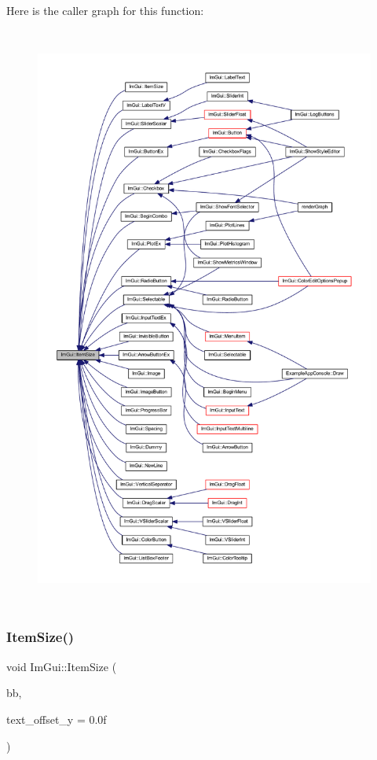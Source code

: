 Here is the caller graph for this function\+:
\nopagebreak
\begin{figure}[H]
\begin{center}
\leavevmode
\includegraphics[height=550pt]{namespace_im_gui_ac7b9a7399d9606b25278002303f545b6_icgraph}
\end{center}
\end{figure}
\mbox{\label{namespace_im_gui_a97b821f022e36964b40973fe1ff4367b}} 
\subsubsection{\texorpdfstring{Item\+Size()}{ItemSize()}\hspace{0.1cm}{\footnotesize\ttfamily [2/2]}}
{\footnotesize\ttfamily void Im\+Gui\+::\+Item\+Size (\begin{DoxyParamCaption}\item[{const \mbox{\hyperlink{struct_im_rect}{Im\+Rect}} \&}]{bb,  }\item[{float}]{text\+\_\+offset\+\_\+y = {\ttfamily 0.0f} }\end{DoxyParamCaption})}

